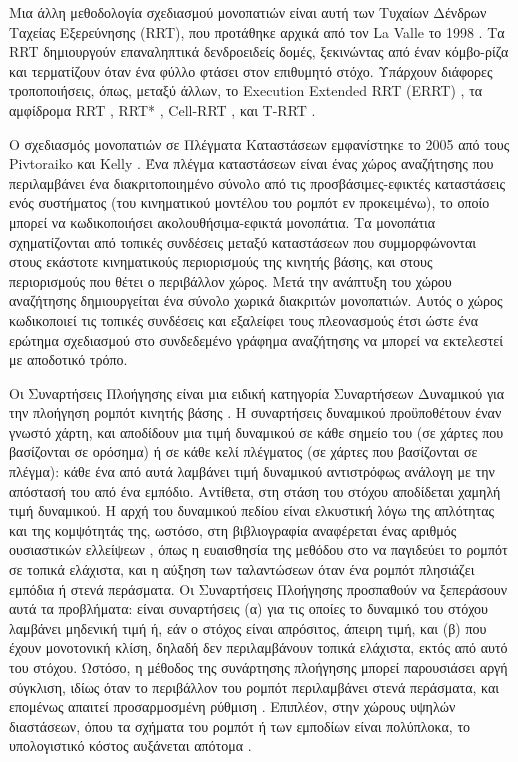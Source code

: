 Μια άλλη μεθοδολογία σχεδιασμού μονοπατιών είναι αυτή των Τυχαίων Δένδρων
Ταχείας Εξερεύνησης (RRT), που προτάθηκε αρχικά από τον La Valle το 1998
\cite{Lavalle1998}. Τα RRT δημιουργούν επαναληπτικά δενδροειδείς δομές,
ξεκινώντας από έναν κόμβο-ρίζα και τερματίζουν όταν ένα φύλλο φτάσει στον
επιθυμητό στόχο. Υπάρχουν διάφορες τροποποιήσεις, όπως, μεταξύ άλλων, το
Execution Extended RRT (ERRT) \cite{Bruce}, τα αμφίδρομα RRT \cite{Martin2007},
RRT* \cite{Karaman2010}, Cell-RRT \cite{Guitton2009}, και T-RRT
\cite{Jaillet2010}.

Ο σχεδιασμός μονοπατιών σε Πλέγματα Καταστάσεων εμφανίστηκε το 2005 από τους
Pivtoraiko και Kelly \cite{MikhailPivtoraiko2005}. Ένα πλέγμα καταστάσεων είναι
ένας χώρος αναζήτησης που περιλαμβάνει ένα διακριτοποιημένο σύνολο από τις
προσβάσιμες-εφικτές καταστάσεις ενός συστήματος (του κινηματικού μοντέλου του
ρομπότ εν προκειμένω), το οποίο μπορεί να κωδικοποιήσει ακολουθήσιμα-εφικτά
μονοπάτια. Τα μονοπάτια σχηματίζονται από τοπικές συνδέσεις μεταξύ καταστάσεων
που συμμορφώνονται στους εκάστοτε κινηματικούς περιορισμούς της κινητής βάσης,
και στους περιορισμούς που θέτει ο περιβάλλον χώρος. Μετά την ανάπτυξη του χώρου
αναζήτησης δημιουργείται ένα σύνολο χωρικά διακριτών μονοπατιών. Αυτός ο χώρος
κωδικοποιεί τις τοπικές συνδέσεις και εξαλείφει τους πλεονασμούς έτσι ώστε ένα
ερώτημα σχεδιασμού στο συνδεδεμένο γράφημα αναζήτησης να μπορεί να εκτελεστεί
με αποδοτικό τρόπο.

Οι Συναρτήσεις Πλοήγησης είναι μια ειδική κατηγορία Συναρτήσεων Δυναμικού για
την πλοήγηση ρομπότ κινητής βάσης \cite{Latombe1991}. Η συναρτήσεις δυναμικού
προϋποθέτουν έναν γνωστό χάρτη, και αποδίδουν μια τιμή δυναμικού σε κάθε σημείο
του (σε χάρτες που βασίζονται σε ορόσημα) ή σε κάθε κελί πλέγματος (σε χάρτες
που βασίζονται σε πλέγμα): κάθε ένα από αυτά λαμβάνει τιμή δυναμικού αντιστρόφως
ανάλογη με την απόστασή του από ένα εμπόδιο. Αντίθετα, στη στάση του στόχου
αποδίδεται χαμηλή τιμή δυναμικού. Η αρχή του δυναμικού πεδίου είναι ελκυστική
λόγω της απλότητας και της κομψότητάς της, ωστόσο, στη βιβλιογραφία αναφέρεται
ένας αριθμός ουσιαστικών ελλείψεων \cite{Koren}\cite{Ge2000}, όπως η
ευαισθησία της μεθόδου στο να παγιδεύει το ρομπότ σε τοπικά ελάχιστα, και η
αύξηση των ταλαντώσεων όταν ένα ρομπότ πλησιάζει εμπόδια ή στενά περάσματα. Οι
Συναρτήσεις Πλοήγησης προσπαθούν να ξεπεράσουν αυτά τα προβλήματα: είναι
συναρτήσεις (α) για τις οποίες το δυναμικό του στόχου λαμβάνει μηδενική τιμή ή,
εάν ο στόχος είναι απρόσιτος, άπειρη τιμή, και (β) που έχουν μονοτονική κλίση,
δηλαδή δεν περιλαμβάνουν τοπικά ελάχιστα, εκτός από αυτό του στόχου. Ωστόσο, η
μέθοδος της συνάρτησης πλοήγησης μπορεί παρουσιάσει αργή σύγκλιση, ιδίως όταν
το περιβάλλον του ρομπότ περιλαμβάνει στενά περάσματα, και επομένως απαιτεί
προσαρμοσμένη ρύθμιση \cite{Kowalczyk2019}. Επιπλέον, στην χώρους υψηλών
διαστάσεων, όπου τα σχήματα του ρομπότ ή των εμποδίων είναι πολύπλοκα, το
υπολογιστικό κόστος αυξάνεται απότομα \cite{Park2016}.

